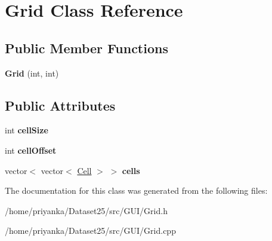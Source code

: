 \hypertarget{classGrid}{\section{\-Grid \-Class \-Reference}
\label{classGrid}
}
\subsection*{\-Public \-Member \-Functions}
\begin{DoxyCompactItemize}
\item 
\hypertarget{classGrid_a2a809d16ae2ba160bd3a0e7a8f6406df}{{\bfseries \-Grid} (int, int)}\label{classGrid_a2a809d16ae2ba160bd3a0e7a8f6406df}

\end{DoxyCompactItemize}
\subsection*{\-Public \-Attributes}
\begin{DoxyCompactItemize}
\item 
\hypertarget{classGrid_a0c0c3a73c34785ee823cd08612efd4da}{int {\bfseries cell\-Size}}\label{classGrid_a0c0c3a73c34785ee823cd08612efd4da}

\item 
\hypertarget{classGrid_a28a6e74ffa7a0e8a2c885c269c2d1a37}{int {\bfseries cell\-Offset}}\label{classGrid_a28a6e74ffa7a0e8a2c885c269c2d1a37}

\item 
\hypertarget{classGrid_ade574c0d539d2b33b1cb57f6fd47dd2f}{vector$<$ vector$<$ \hyperlink{classCell}{\-Cell} $>$ $>$ {\bfseries cells}}\label{classGrid_ade574c0d539d2b33b1cb57f6fd47dd2f}

\end{DoxyCompactItemize}


\-The documentation for this class was generated from the following files\-:\begin{DoxyCompactItemize}
\item 
/home/priyanka/\-Dataset25/src/\-G\-U\-I/\-Grid.\-h\item 
/home/priyanka/\-Dataset25/src/\-G\-U\-I/\-Grid.\-cpp\end{DoxyCompactItemize}
